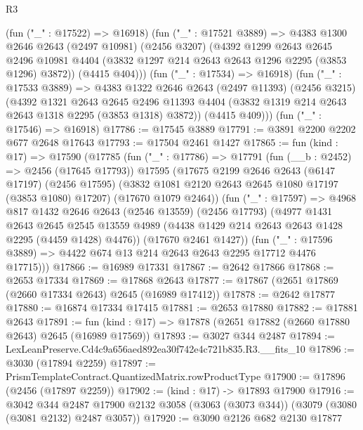 \begin{lexlean}{R3}
\begin{coremodule}
        (fun ("_" : @17522) => @16918)
        (fun ("_" : @17521 @3889) =>
        @4383
          @1300
          @2646
          @2643
          (@2497 @10981)
          (@2456 @3207)
          (@4392
            @1299
            @2643
            @2645
            @2496
            @10981
            @4404
            (@3832 @1297 @214 @2643 @2643 @1296 @2295 (@3853 @1296) @3872))
          (@4415 @404)))
      (fun ("_" : @17534) => @16918)
      (fun ("_" : @17533 @3889) =>
      @4383
        @1322
        @2646
        @2643
        (@2497 @11393)
        (@2456 @3215)
        (@4392
          @1321
          @2643
          @2645
          @2496
          @11393
          @4404
          (@3832 @1319 @214 @2643 @2643 @1318 @2295 (@3853 @1318) @3872))
        (@4415 @409)))
    (fun ("_" : @17546) => @16918)
@17786 := @17545 @3889
@17791 := @3891 @2200 @2202 @677 @2648 @17643
@17793 := @17504 @2461 @1427
@17865 := fun (kind : @17) =>
  @17590
    (@17785
      (fun ("_" : @17786) =>
      @17791
        (fun (__b : @2452) => @2456 (@17645 @17793))
        @17595
        (@17675
          @2199
          @2646
          @2643
          (@6147 @17197)
          (@2456 @17595)
          (@3832 @1081 @2120 @2643 @2645 @1080 @17197 (@3853 @1080) @17207)
          (@17670 @1079 @2464))
        (fun ("_" : @17597) =>
        @4968
          @817
          @1432
          @2646
          @2643
          (@2546 @13559)
          (@2456 @17793)
          (@4977
            @1431
            @2643
            @2645
            @2545
            @13559
            @4989
            (@4438 @1429 @214 @2643 @2643 @1428 @2295 (@4459 @1428) @4476))
          (@17670 @2461 @1427))
        (fun ("_" : @17596 @3889) => @4422 @674 @13 @214 @2643 @2643 @2295 @17712 @4476 @17715)))
@17866 := @16989 @17331
@17867 := @2642 @17866
@17868 := @2653 @17334
@17869 := @17868 @2643
@17877 := @17867 (@2651 @17869 (@2660 @17334 @2643) @2645 (@16989 @17412))
@17878 := @2642 @17877
@17880 := @16874 @17334 @17415
@17881 := @2653 @17880
@17882 := @17881 @2643
@17891 := fun (kind : @17) => @17878 (@2651 @17882 (@2660 @17880 @2643) @2645 (@16989 @17569))
@17893 := @3027 @344 @2487
@17894 := LexLeanPreserve.Cd4c9a656aed892ea30f742e4c721b835.R3.__fits_10
@17896 := @3030 (@17894 @2259)
@17897 := PrismTemplateContract.QuantizedMatrix.rowProductType
@17900 := @17896 (@2456 (@17897 @2259))
@17902 := (kind : @17) -> @17893 @17900
@17916 := @3042
    @344
    @2487
    @17900
    @2132
    @3058
    (@3063 (@3073 @344))
    (@3079 (@3080 (@3081 @2132) @2487 @3057))
@17920 := @3090 @2126 @682 @2130 @17877

\end{coremodule}
\end{lexlean}
